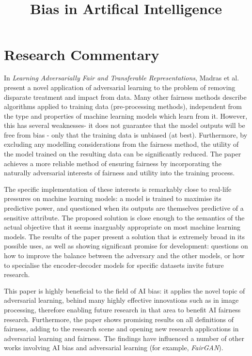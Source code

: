 \documentclass[conference]{IEEEtran}
\begin{document}
\title{Bias in Artifical Intelligence}
\author{
}
\maketitle

\section{Research Commentary}

In \emph{Learning Adversarially Fair and Transferable Representations}, Madras et al. present a novel application of adversarial learning to the problem of removing disparate treatment and impact from data. Many other fairness methods describe algorithms applied to training data (pre-processing methods), independent from the type and properties of machine learning models which learn from it. However, this has several weaknesses- it does not guarantee that the model outputs will be free from bias - only that the training data is unbiased (at best). Furthermore, by excluding any modelling considerations from the fairness method, the utility of the model trained on the resulting data can be significantly reduced. The paper achieves a more reliable method of ensuring fairness by incorporating the naturally adversarial interests of fairness and utility into the training process.

The specific implementation of these interests is remarkably close to real-life pressures on machine learning models: a model is trained to maximise its predictive power, and questioned when its outputs are themselves predictive of a sensitive attribute. The proposed solution is close enough to the semantics of the actual objective that it seems inarguably appropriate on most machine learning models. The results of the paper present a solution that is extremely broad in its possible uses, as well as showing significant promise for development: questions on how to improve the balance between the adversary and the other models, or how to specialise the encoder-decoder models for specific datasets invite future research.

This paper is highly beneficial to the field of AI bias: it applies the novel topic of adversarial learning, behind many highly effective innovations such as in image processing\cite{DBLP:journals/corr/HuangZLH17}\cite{DBLP:journals/corr/ZhuPIE17}, therefore enabling future research in that area to benefit AI fairness research. Furthermore, the paper shows promising results on all definitions of fairness, adding to the research scene and opening new research applications in adversarial learning and fairness. The findings have influenced a number of other works involving AI bias and adversarial learning (for example, \emph{FairGAN}\cite{DBLP:journals/corr/abs-1805-11202}).
\end{document}

